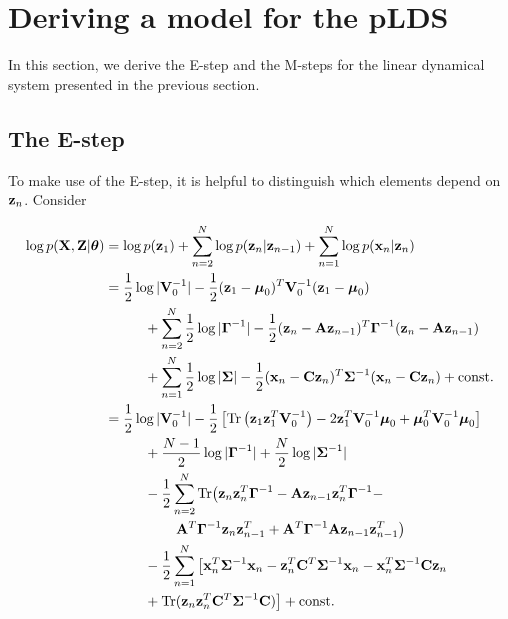 \documentclass[11pt]{article}
\numberwithin{equation}{section}
\newcommand{\x}{{\bf x}}
\newcommand{\z}{{\bf z}}
\begin{document}

\section{Deriving a model for the pLDS}
In this section, we derive the E-step and the M-steps for the linear dynamical system presented in the previous section.

\subsection{The E-step}
To make use of the E-step, it is helpful to distinguish which elements depend on $\z_n$. Consider

\begin{align}
	\log p({\bf X}, {\bf Z}\vert \boldsymbol\theta) &= \log p(\z_1) + \sum_{n=2}^N \log p(\z_n\vert \z_{n-1}) + \sum_{n=1}^N \log p(\x_n\vert \z_n)\\
	   &=\frac{1}{2}\log\vert{\bf V}_0^{-1}\vert - \frac{1}{2}(\z_1 - \boldsymbol\mu_0)^T{\bf V}_0^{-1}(\z_1 - \boldsymbol\mu_0) \nonumber \\
	   &\hspace{1cm}+ \sum_{n=2}^N \frac{1}{2}\log\vert\boldsymbol\Gamma^{-1}\vert - \frac{1}{2}(\z_n - {\bf A z}_{n-1})^T\boldsymbol{\Gamma}^{-1}(\z_n - {\bf A z}_{n-1}) \nonumber \\
	   &\hspace{1cm}+\sum_{n=1}^N \frac{1}{2}\log\vert\boldsymbol\Sigma\vert -\frac{1}{2}(\x_n - {\bf C z}_n)^T \boldsymbol{\Sigma}^{-1}(\x_n - {\bf C z}_n) + \text{const.}\\
	   &= \frac{1}{2}\log \vert
	  {\bf V}_0^{-1}\vert -\frac{1}{2}\left[\text{Tr}\left(\z_1 \z_1^T {\bf V}_0^{-1}\right) -2 \z_1^T{\bf V}_0^{-1}\boldsymbol\mu_0 + \boldsymbol\mu_0^T {\bf V}_0^{-1}\boldsymbol\mu_0\right] \nonumber \\
	  &\hspace{1cm}+ \frac{N-1}{2}\log\vert\boldsymbol\Gamma^{-1}\vert + \frac{N}{2}\log\vert \boldsymbol\Sigma^{-1}\vert \nonumber \\
	  &\hspace{1cm}-\frac{1}{2} \sum_{n=2}^{N}\text{Tr}\big(\z_n\z_n^T\boldsymbol\Gamma^{-1} -{\bf A} \z_{n-1}\z_n^T\boldsymbol\Gamma^{-1} - \nonumber\\
	  &\hspace{1.8cm}{\bf A}^T\boldsymbol{\Gamma}^{-1}\z_n\z_{n-1}^T + {\bf A}^T \boldsymbol\Gamma^{-1}{\bf A}\z_{n-1}\z_{n-1}^T\big) \nonumber\\
	  &\hspace{1cm}-\frac{1}{2}\sum_{n=1}^N\big[\x_n^T\boldsymbol{\Sigma}^{-1}\x_n - \z_n^T{\bf C}^T\boldsymbol\Sigma^{-1}\x_n - \x_n^T\boldsymbol{\Sigma}^{-1}{\bf C}\z_n  \\
	  &\hspace{1cm} + \text{Tr}(\z_n\z_n^T{\bf C}^T\boldsymbol\Sigma^{-1}{\bf C})\big] + \text{const.} \label{eq:complete-log-likelihood}
\end{align}
\end{document}
